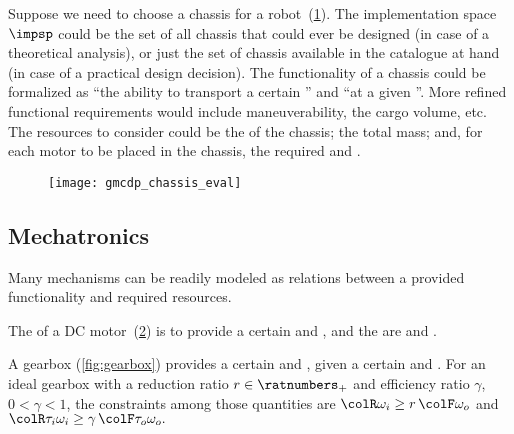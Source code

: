 \begin{example}
  \label{exa:chassis}Suppose we need to choose a chassis for a robot~(\cref{fig:gmcdp_chassis_eval}).
  The implementation space~$\impsp$ could be the set of all chassis
  that could ever be designed (in case of a theoretical analysis), or
  just the set of chassis available in the catalogue at hand (in case
  of a practical design decision). The functionality of a chassis could
  be formalized as ``the ability to transport a certain '' and ``at a given ''. More refined
  functional requirements would include maneuverability, the cargo volume,
  etc. The resources to consider could be the  of
  the chassis; the total mass; and, for each motor to be placed in the
  chassis, the required  and .
\end{example}
\begin{figure}[h]
  \centering
  \texttt{[image: gmcdp\_chassis\_eval]}
  \caption{}
  \label{fig:gmcdp_chassis_eval}
\end{figure}

\subsection{Mechatronics}


Many mechanisms can be readily modeled as relations between a provided
functionality and required resources.


\begin{example}
  The  of a DC motor~(\cref{fig:dc_motor})
  is to provide a certain  and , and the 
  are  and .
\end{example}

\begin{figure}[h]
  \begin{center}
  \end{center}
  \caption{}
  \label{fig:dc_motor}
\end{figure}


\begin{example}
  A gearbox (\cref{fig:gearbox}) provides a certain  and , given a certain
   and . For
  an ideal gearbox with a reduction ratio $r \in \ratnumbers_+$ and
  efficiency ratio $\gamma$, $0<\gamma<1$, the constraints among
  those quantities are ${\colR \omega_i}\geq r\,{\colF \omega_o}$
  and ${\colR \tau_i\omega_i}\geq\gamma\,{\colF \tau_o\omega_o}.$
\end{example}

